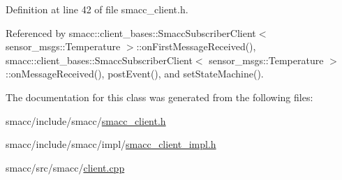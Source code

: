 Definition at line 42 of file smacc\+\_\+client.\+h.



Referenced by smacc\+::client\+\_\+bases\+::\+Smacc\+Subscriber\+Client$<$ sensor\+\_\+msgs\+::\+Temperature $>$\+::on\+First\+Message\+Received(), smacc\+::client\+\_\+bases\+::\+Smacc\+Subscriber\+Client$<$ sensor\+\_\+msgs\+::\+Temperature $>$\+::on\+Message\+Received(), post\+Event(), and set\+State\+Machine().



The documentation for this class was generated from the following files\+:\begin{DoxyCompactItemize}
\item 
smacc/include/smacc/\hyperlink{smacc__client_8h}{smacc\+\_\+client.\+h}\item 
smacc/include/smacc/impl/\hyperlink{smacc__client__impl_8h}{smacc\+\_\+client\+\_\+impl.\+h}\item 
smacc/src/smacc/\hyperlink{client_8cpp}{client.\+cpp}\end{DoxyCompactItemize}
